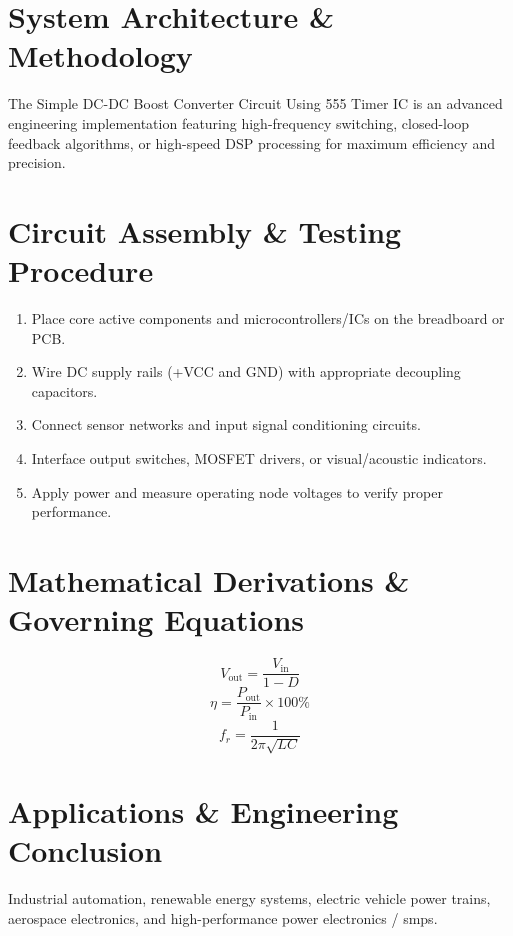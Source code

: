 \documentclass[11pt,a4paper]{article}
\begin{document}
\section{System Architecture \& Methodology}
The Simple DC-DC Boost Converter Circuit Using 555 Timer IC is an advanced engineering implementation featuring high-frequency switching, closed-loop feedback algorithms, or high-speed DSP processing for maximum efficiency and precision.

\section{Circuit Assembly \& Testing Procedure}
\begin{enumerate}
    \item Place core active components and microcontrollers/ICs on the breadboard or PCB.
    \item Wire DC supply rails (+VCC and GND) with appropriate decoupling capacitors.
    \item Connect sensor networks and input signal conditioning circuits.
    \item Interface output switches, MOSFET drivers, or visual/acoustic indicators.
    \item Apply power and measure operating node voltages to verify proper performance.
\end{enumerate}

\section{Mathematical Derivations \& Governing Equations}
\begin{equation}
V_{\text{out}} = \frac{V_{\text{in}}}{1 - D}
\end{equation}
\begin{equation}
\eta = \frac{P_{\text{out}}}{P_{\text{in}}} \times 100\%
\end{equation}
\begin{equation}
f_r = \frac{1}{2\pi \sqrt{L C}}
\end{equation}

\section{Applications \& Engineering Conclusion}
Industrial automation, renewable energy systems, electric vehicle power trains, aerospace electronics, and high-performance power electronics / smps.
\end{document}
